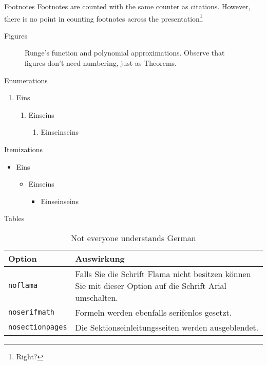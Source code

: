 \documentclass{beamer}
\begin{document}
\begin{frame}{Footnotes}
Footnotes are counted with the same counter as citations. However, there is no point in counting footnotes across the presentation\footnote{Right?}
\end{frame}
	
\begin{frame}{Figures}
\begin{figure}
\scalebox{0.6}{}
\caption{Runge's function and polynomial approximations. Observe that figures don't need numbering, just as Theorems.}
\end{figure}
\end{frame}

\begin{frame}{Enumerations}
\begin{enumerate}
\item Eins
\begin{enumerate}
\item Einseins
\begin{enumerate}
\item Einseinseins
\end{enumerate}
\end{enumerate}
\end{enumerate}
\end{frame}

\begin{frame}{Itemizations}
\begin{itemize}
	\item Eins
	\begin{itemize}
		\item Einseins
		\begin{itemize}
			\item Einseinseins
		\end{itemize}
	\end{itemize}
\end{itemize}
\end{frame}

\begin{frame}{Tables}
\begin{table}[]
\begin{tabularx}{\linewidth}{l>{\raggedright}X}
		\toprule
		\textbf{Option}			& \textbf{Auswirkung} \tabularnewline
		\midrule
		\texttt{noflama}		& Falls Sie die Schrift Flama nicht besitzen können Sie mit dieser Option auf die Schrift Arial umschalten. \tabularnewline
		\texttt{noserifmath}		& Formeln werden ebenfalls serifenlos gesetzt. \tabularnewline
		\texttt{nosectionpages} & Die Sektionseinleitungsseiten werden ausgeblendet.\tabularnewline
		\bottomrule
\end{tabularx}
\caption{Not everyone understands German}
\end{table}
\end{frame}
\end{document}
